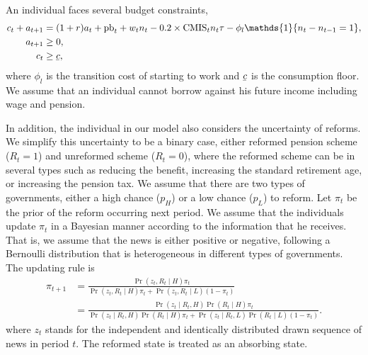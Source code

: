 \documentclass[12pt]{article}
\begin{document}
\begin{CJK*}{UTF8}{bsmi}
An individual faces several budget constraints,
\begin{align}
    c_t + a_{t+1} &= (1+r)a_t + \text{pb}_t + w_tn_t - 0.2\times\text{CMIS}_tn_t\tau - \phi_l\mathds{1}\{n_t-n_{t-1}=1\},\label{eq:asset-accumulation}\\
    a_{t+1} &\geq 0,\label{eq:no-borrow}\\
    c_t &\geq \underaccent{\bar}{c}\label{eq:cfloor},
\end{align}
where \(\phi_l\) is the transition cost of starting to work 
and \(\underaccent{\bar}{c}\) is the consumption floor. We 
assume that an individual cannot borrow against his future 
income including wage and pension. 

In addition, the individual in our model also considers the 
uncertainty of reforms. We simplify this uncertainty to be a 
binary case, either reformed pension scheme (\(R_t = 1\)) and 
unreformed scheme (\(R_t = 0\)), where the reformed scheme 
can be in several types such as reducing the benefit, 
increasing the standard retirement age, or increasing the 
pension tax. We assume that there are two types of 
governments, either a high chance (\(p_H\)) or a low chance 
(\(p_L\)) to reform. Let \(\pi_t\) be the prior of the reform 
occurring next period. We assume that the individuals update 
\(\pi_t\) in a Bayesian manner according to the information 
that he receives. That is, we assume that the news is either 
positive or negative, following a Bernoulli distribution that 
is heterogeneous in different types of governments. The 
updating rule is 
\begin{equation}\label{eq:update}
    \begin{split}
        \pi_{t+1} 
        &= \frac{\Pr(z_t, R_t\mid H)\pi_t}{\Pr(z_t, R_t\mid H)\pi_t + \Pr(z_t, R_t\mid L)(1-\pi_t)} \\
        &= \frac{\Pr(z_t\mid R_t,H)\Pr(R_t\mid H)\pi_t}{\Pr(z_t\mid R_t,H)\Pr(R_t\mid H)\pi_t + \Pr(z_t\mid R_t,L)\Pr(R_t\mid L)(1-\pi_t)}.
    \end{split}
\end{equation}
where \(z_t\) stands for the independent and identically 
distributed drawn sequence of news in period \(t\). The reformed 
state is treated as an absorbing state. 


\end{CJK*}
\end{document}
